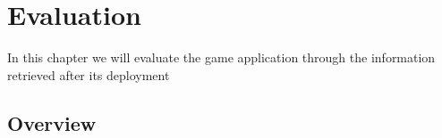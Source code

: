 \chapter{Evaluation}
\label{chap:evaluation}
\begin{chapterintro}
In this chapter we will evaluate the game application through the information retrieved after its deployment
\end{chapterintro}

\cleardoublepage
\section{Overview}
